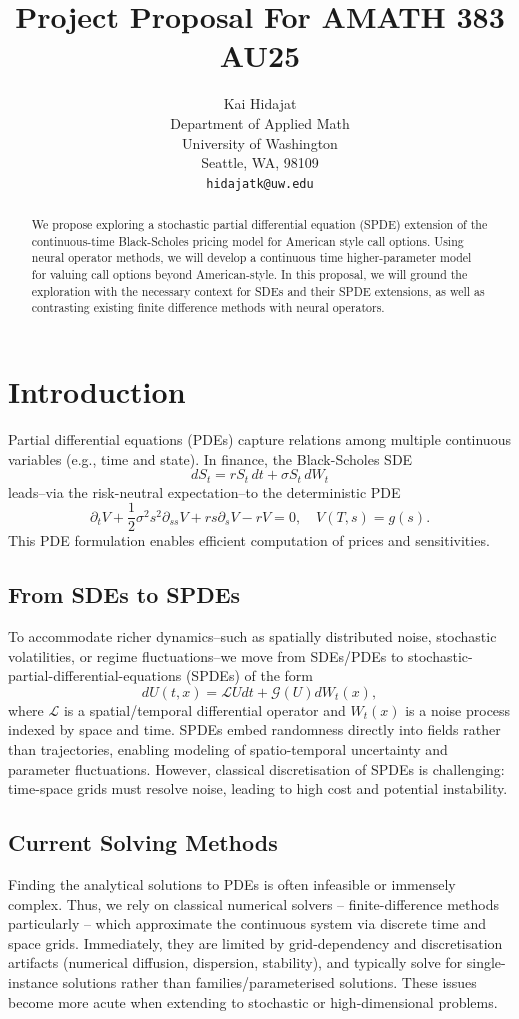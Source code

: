 \documentclass{article}
\title{Project Proposal For AMATH 383 AU25}
\author{%
  Kai Hidajat \\
  Department of Applied Math \\
  University of Washington \\
  Seattle, WA, 98109\\
  \texttt{hidajatk@uw.edu} \\
}
\begin{document}
\maketitle


\begin{abstract}
    We propose exploring a stochastic partial differential equation (SPDE) extension of the continuous-time Black-Scholes pricing model for American style call options. Using neural operator methods, we will develop a continuous time higher-parameter model for valuing call options beyond American-style. In this proposal, we will ground the exploration with the necessary context for SDEs and their SPDE extensions, as well as contrasting existing finite difference methods with neural operators.
\end{abstract}

\clearpage

\section{Introduction} %
Partial differential equations (PDEs) capture relations among multiple continuous variables (e.g., time and state). In finance, the Black-Scholes SDE
\[
    dS_t = rS_t \,dt + \sigma S_t \,dW_t
\]
leads--via the risk-neutral expectation--to the deterministic PDE \citep{nayak2025mathematicalmodelingoptionpricing}
\[
    \partial_t V + \frac12\sigma^2 s^2 \partial_{ss}V + r s\partial_sV - rV = 0,\quad V(T,s)=g(s).
\]
This PDE formulation enables efficient computation of prices and sensitivities.  

\subsection{From SDEs to SPDEs}
To accommodate richer dynamics--such as spatially distributed noise, stochastic volatilities, or regime fluctuations--we move from SDEs/PDEs to stochastic-partial-differential-equations (SPDEs) of the form
\[
    dU(t,x)=\mathcal LU dt + \mathcal G(U) dW_t(x),
\]
where \(\mathcal L\) is a spatial/temporal differential operator and \(W_t(x)\) is a noise process indexed by space and time. SPDEs embed randomness directly into fields rather than trajectories, enabling modeling of spatio-temporal uncertainty and parameter fluctuations. However, classical discretisation of SPDEs is challenging: time-space grids must resolve noise, leading to high cost and potential instability.

\subsection{Current Solving Methods}
Finding the analytical solutions to PDEs is often infeasible or immensely complex. Thus, we rely on classical numerical solvers -- finite-difference methods particularly -- which approximate the continuous system via discrete time and space grids. Immediately, they are limited by grid-dependency and discretisation artifacts (numerical diffusion, dispersion, stability), and typically solve for single-instance solutions rather than families/parameterised solutions. These issues become more acute when extending to stochastic or high-dimensional problems.
\end{document}
